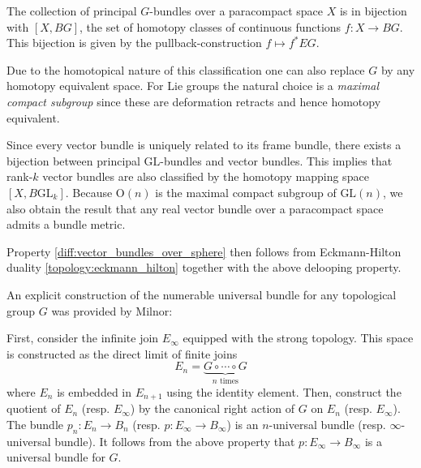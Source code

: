     \begin{property}[Classification]\label{diff:prin:classification}
        The collection of principal $G$-bundles over a paracompact space $X$ is in bijection with $[X, BG]$, the set of homotopy classes of continuous functions $f:X\rightarrow BG$. This bijection is given by the pullback-construction $f\mapsto f^*EG$.

        Due to the homotopical nature of this classification one can also replace $G$ by any homotopy equivalent space. For Lie groups the natural choice is a \textit{maximal compact subgroup} since these are deformation retracts and hence homotopy equivalent.
    \end{property}
    \begin{result}
        Since every vector bundle is uniquely related to its frame bundle, there exists a bijection between principal $\text{GL}$-bundles and vector bundles. This implies that rank-$k$ vector bundles are also classified by the homotopy mapping space $[X, B\text{GL}_k]$. Because $\text{O}(n)$ is the maximal compact subgroup of $\text{GL}(n)$, we also obtain the result that any real vector bundle over a paracompact space admits a bundle metric.

        Property \ref{diff:vector_bundles_over_sphere} then follows from Eckmann-Hilton duality \ref{topology:eckmann_hilton} together with the above delooping property.
    \end{result}


    An explicit construction of the numerable universal bundle for any topological group $G$ was provided by Milnor:
    \begin{construct}
        First, consider the infinite join $E_\infty$ equipped with the strong topology. This space is constructed as the direct limit of finite joins \[E_n=\underbrace{G\circ\cdots\circ G}_{n\text{ times}}\] where $E_n$ is embedded in $E_{n+1}$ using the identity element. Then, construct the quotient of $E_n$ (resp. $E_\infty$) by the canonical right action of $G$ on $E_n$ (resp. $E_\infty$). The bundle $p_n:E_n\rightarrow B_n$ (resp. $p:E_\infty\rightarrow B_\infty$) is an $n$-universal bundle (resp. $\infty$-universal bundle). It follows from the above property that $p:E_\infty\rightarrow B_\infty$ is a universal bundle for $G$.
    \end{construct}

